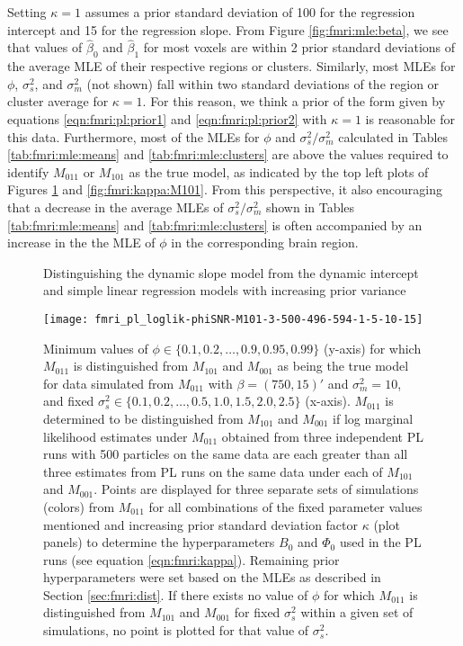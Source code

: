 Setting $\kappa = 1$ assumes a prior standard deviation of 100 for the regression intercept and 15 for the regression slope. From Figure \ref{fig:fmri:mle:beta}, we see that values of $\hat{\beta}_0$ and $\hat{\beta}_1$ for most voxels are within 2 prior standard deviations of the average MLE of their respective regions or clusters. Similarly, most MLEs for $\phi$, $\sigma^2_s$, and $\sigma^2_m$ (not shown) fall within two standard deviations of the region or cluster average for $\kappa = 1$. For this reason, we think a prior of the form given by equations \eqref{eqn:fmri:pl:prior1} and \eqref{eqn:fmri:pl:prior2} with $\kappa = 1$ is reasonable for this data. Furthermore, most of the MLEs for $\phi$ and $\sigma^2_s / \sigma^2_m$ calculated in Tables \ref{tab:fmri:mle:means} and \ref{tab:fmri:mle:clusters} are above the values required to identify $M_{011}$ or $M_{101}$ as the true model, as indicated by the top left plots of Figures \ref{fig:fmri:kappa:M011} and \ref{fig:fmri:kappa:M101}. From this perspective, it also encouraging that a decrease in the average MLEs of $\sigma^2_s / \sigma^2_m$ shown in Tables \ref{tab:fmri:mle:means} and \ref{tab:fmri:mle:clusters} is often accompanied by an increase in the the MLE of $\phi$ in the corresponding brain region.

\begin{figure}
\ssp
\centering
\caption{Distinguishing the dynamic slope model from the dynamic intercept and simple linear regression models with increasing prior variance} \label{fig:fmri:kappa:M011}
\texttt{[image: fmri\_pl\_loglik-phiSNR-M101-3-500-496-594-1-5-10-15]}
\caption*{Minimum values of $\phi \in \{0.1,0.2,\ldots,0.9,0.95,0.99\}$ (y-axis) for which $M_{011}$ is distinguished from $M_{101}$ and $M_{001}$ as being the true model for data simulated from $M_{011}$ with $\beta = (750,15)'$ and $\sigma^2_m = 10$, and fixed $\sigma^2_s \in \{0.1,0.2,\ldots,0.5,1.0,1.5,2.0,2.5\}$ (x-axis). $M_{011}$ is determined to be distinguished from $M_{101}$ and $M_{001}$ if log marginal likelihood estimates under $M_{011}$ obtained from three independent PL runs with 500 particles on the same data are each greater than all three estimates from PL runs on the same data under each of $M_{101}$ and $M_{001}$. Points are displayed for three separate sets of simulations (colors) from $M_{011}$ for all combinations of the fixed parameter values mentioned and increasing prior standard deviation factor $\kappa$ (plot panels) to determine the hyperparameters $B_0$ and $\Phi_0$ used in the PL runs (see equation \eqref{eqn:fmri:kappa}). Remaining prior hyperparameters were set based on the MLEs as described in Section \ref{sec:fmri:dist}. If there exists no value of $\phi$ for which $M_{011}$ is distinguished from $M_{101}$ and $M_{001}$ for fixed $\sigma^2_s$ within a given set of simulations, no point is plotted for that value of $\sigma^2_s$.}
\end{figure}

